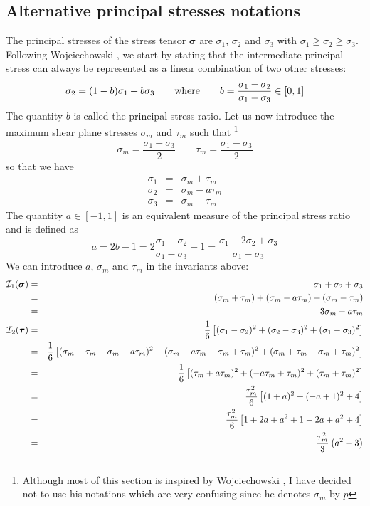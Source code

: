\subsection{Alternative principal stresses notations}\label{sec:altinv}

The principal stresses of the stress tensor ${\bm \sigma}$ are $\sigma_1$, $\sigma_2$
and $\sigma_3$ with $\sigma_1 \geq \sigma_2 \geq \sigma_3$.
Following Wojciechowski \cite{wojc18}, we start by stating that the intermediate principal 
stress can always be represented as a linear combination of two other stresses:
\begin{equation}
\sigma_2 = (1-b)\sigma_1 + b \sigma_3
\qquad
{\rm where}
\qquad
b = \frac{\sigma_1-\sigma_2}{\sigma_1-\sigma_3}\in [0,1]
\end{equation}
The quantity $b$ is called the principal stress ratio. 
Let us now introduce the maximum shear plane stresses $\sigma_m$ and $\tau_m$ such that
\footnote{Although most of this section is inspired by Wojciechowski \cite{wojc18}, 
I have decided not to use his notations which are very confusing since he denotes $\sigma_m$ by $p$} 
\begin{equation}
\boxed{\sigma_m=\frac{\sigma_1+\sigma_3}{2}}
\qquad
\boxed{\tau_m=\frac{\sigma_1-\sigma_3}{2}}
\end{equation}
so that we have 
\begin{eqnarray}
\sigma_1 &=& \sigma_m+\tau_m \\
\sigma_2 &=& \sigma_m-a\tau_m \\ 
\sigma_3 &=& \sigma_m-\tau_m
\end{eqnarray}
The quantity $a\in[-1,1]$ is an equivalent measure of the principal stress ratio and 
is defined as 
\begin{equation}
a=2b-1 =2 \frac{\sigma_1-\sigma_2}{\sigma_1-\sigma_3}-1=\frac{\sigma_1-2\sigma_2+\sigma_3}{\sigma_1-\sigma_3}
\end{equation}
We can introduce $a$, $\sigma_m$ and $\tau_m$ in the invariants above:
\begin{eqnarray}
{\cal I}_1({\bm \sigma}) 
&=& \sigma_1 + \sigma_2 + \sigma_3 \nonumber\\
&=& (\sigma_m+\tau_m) + (\sigma_m-a\tau_m) + (\sigma_m-\tau_m) \nonumber\\
&=& 3\sigma_m -a\tau_m \\
{\cal I}_2({\bm \tau}) 
&=&\frac{1}{6}\left[(\sigma_{1}-\sigma_{2})^2 +(\sigma_{2}-\sigma_{3})^2 +(\sigma_{1}-\sigma_{3})^2\right]\nonumber\\ 
&=&\frac{1}{6}\left[(\sigma_m+\tau_m-\sigma_m+a\tau_m)^2 +(\sigma_m-a\tau_m-\sigma_m+\tau_m)^2 
+(\sigma_m+\tau_m-\sigma_m+\tau_m)^2\right]\nonumber\\ 
&=&\frac{1}{6}\left[(\tau_m+a\tau_m)^2 +(-a\tau_m+\tau_m)^2 +(\tau_m+\tau_m)^2\right]\nonumber\\ 
&=&\frac{\tau_m^2}{6}\left[(1+a)^2 +(-a+1)^2 + 4 \right]\nonumber\\ 
&=&\frac{\tau_m^2}{6}\left[ 1+2a+a^2 +1 - 2a+a^2 + 4 \right]\nonumber\\ 
&=&\frac{\tau_m^2}{3}\left( a^2 +3 \right)
\end{eqnarray}
